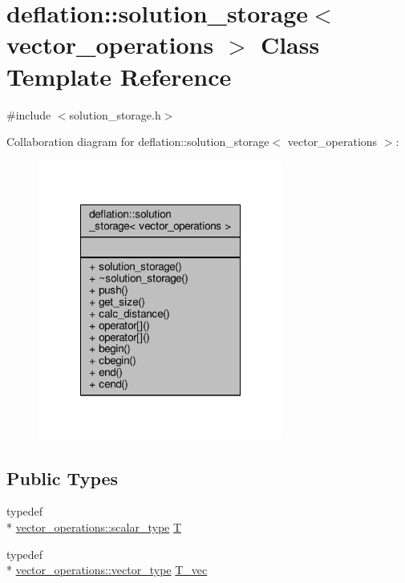 \hypertarget{classdeflation_1_1solution__storage}{\section{deflation\-:\-:solution\-\_\-storage$<$ vector\-\_\-operations $>$ Class Template Reference}
\label{classdeflation_1_1solution__storage}
}


{\ttfamily \#include $<$solution\-\_\-storage.\-h$>$}



Collaboration diagram for deflation\-:\-:solution\-\_\-storage$<$ vector\-\_\-operations $>$\-:
\nopagebreak
\begin{figure}[H]
\begin{center}
\leavevmode
\includegraphics[width=228pt]{classdeflation_1_1solution__storage__coll__graph}
\end{center}
\end{figure}
\subsection*{Public Types}
\begin{DoxyCompactItemize}
\item 
typedef \\*
\hyperlink{structcpu__vector__operations_aca6b216aa1fb172df83d98350e94fd61}{vector\-\_\-operations\-::scalar\-\_\-type} \hyperlink{classdeflation_1_1solution__storage_af347bcf3081cfa0fcd03015ba347e964}{T}
\item 
typedef \\*
\hyperlink{structcpu__vector__operations_a1962836df596ce262704d208e9a6d8f9}{vector\-\_\-operations\-::vector\-\_\-type} \hyperlink{classdeflation_1_1solution__storage_ae65226dde857949785c573bf1bd448a7}{T\-\_\-vec}
\end{DoxyCompactItemize}
